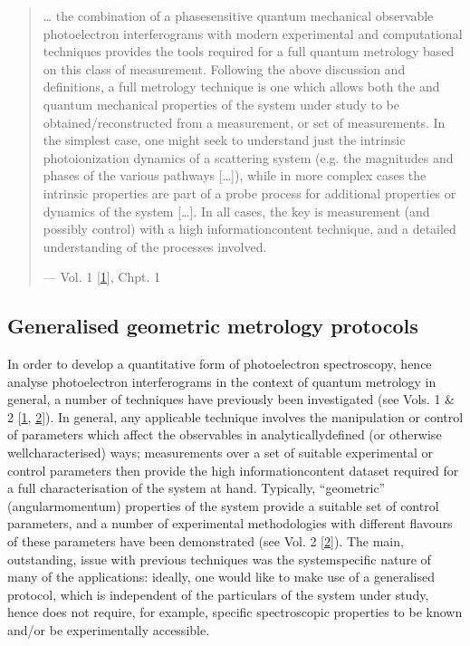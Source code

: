 \documentclass[letterpaper,table,10pt,english]{jupyterBook}
\begin{document}
\begin{quote}
\sphinxAtStartPar
… the combination of a phase\sphinxhyphen{}sensitive quantum mechanical observable \sphinxhyphen{} photoelectron interferograms \sphinxhyphen{} with modern experimental and computational techniques provides the tools required for a full quantum metrology based on this class of measurement. Following the above discussion and definitions, a full metrology technique is one which allows both the  and  quantum mechanical properties of the system under study to be obtained/reconstructed from a measurement, or set of measurements. In the simplest case, one might seek to understand just the intrinsic photoionization dynamics of a scattering system (e.g. the magnitudes and phases of the various pathways {[}…{]}), while in more complex cases the intrinsic properties are part of a probe process for additional properties or dynamics of the system {[}…{]}. In all cases, the key is measurement (and possibly control) with a high information\sphinxhyphen{}content technique, and a detailed understanding of the processes involved.

\begin{flushright}
--- Vol. 1 {[}\hyperlink{cite.backmatter/bibliography:id569}{1}{]}, Chpt. 1
\end{flushright}
\end{quote}


\subsection{Generalised geometric metrology protocols}
\label{\detokenize{part1/main_intro_051122:generalised-geometric-metrology-protocols}}
\sphinxAtStartPar
In order to develop a quantitative form of photoelectron spectroscopy, hence analyse photoelectron interferograms in the context of quantum metrology in general, a number of techniques have previously been investigated (see  Vols. 1 \& 2 {[}\hyperlink{cite.backmatter/bibliography:id569}{1}, \hyperlink{cite.backmatter/bibliography:id570}{2}{]}). In general, any applicable technique involves the manipulation or control of parameters which affect the observables in analytically\sphinxhyphen{}defined (or otherwise well\sphinxhyphen{}characterised) ways; measurements over a set of suitable experimental or control parameters then provide the high information\sphinxhyphen{}content dataset required for a full characterisation of the system at hand. Typically, “geometric” (angular\sphinxhyphen{}momentum) properties of the system provide a suitable set of control parameters, and a number of experimental methodologies with different flavours of these parameters have been demonstrated (see  Vol. 2 {[}\hyperlink{cite.backmatter/bibliography:id570}{2}{]}). The main, outstanding, issue with previous techniques was the system\sphinxhyphen{}specific nature of many of the applications: ideally, one would like to make use of a generalised protocol, which is independent of the particulars of the system under study, hence does not require, for example, specific spectroscopic properties to be known and/or be experimentally accessible.
\end{document}
